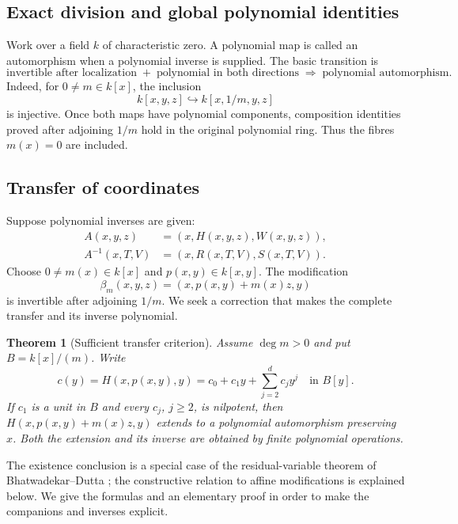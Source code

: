 \documentclass[11pt,a4paper]{article}
\newtheorem{theorem}{Theorem}[section]
\begin{document}
\subsection{Exact division and global polynomial identities}

Work over a field $k$ of characteristic zero. A polynomial map is called an
automorphism when a polynomial inverse is supplied. The basic transition is
\[
\boxed{\text{invertible after localization}
\; +\; \text{polynomial in both directions}
\;\Longrightarrow\; \text{polynomial automorphism}.}
\]
Indeed, for $0\ne m\in k[x]$, the inclusion
\[
k[x,y,z]\hookrightarrow k[x,1/m,y,z]
\]
is injective. Once both maps have polynomial components, composition
identities proved after adjoining $1/m$ hold in the original polynomial
ring. Thus the fibres $m(x)=0$ are included.

\subsection{Transfer of coordinates}

Suppose polynomial inverses are given:
\begin{equation}\label{eq:given}
\begin{aligned}
A(x,y,z)&=(x,H(x,y,z),W(x,y,z)),\\
A^{-1}(x,T,V)&=(x,R(x,T,V),S(x,T,V)).
\end{aligned}
\end{equation}
Choose $0\ne m(x)\in k[x]$ and $p(x,y)\in k[x,y]$. The modification
\[
\beta_m(x,y,z)=(x,p(x,y)+m(x)z,y)
\]
is invertible after adjoining $1/m$. We seek a correction that makes the
complete transfer and its inverse polynomial.

\begin{theorem}[Sufficient transfer criterion]\label{thm:transfer}
Assume $\deg m>0$ and put $B=k[x]/(m)$. Write
\[
c(y)=H(x,p(x,y),y)=c_0+c_1y+\sum_{j=2}^{d}c_jy^j
\quad\text{in }B[y].
\]
If $c_1$ is a unit in $B$ and every $c_j$, $j\ge2$, is nilpotent, then
$H(x,p(x,y)+m(x)z,y)$ extends to a polynomial automorphism preserving $x$.
Both the extension and its inverse are obtained by finite polynomial
operations.
\end{theorem}

The existence conclusion is a special case of the residual-variable
theorem of Bhatwadekar--Dutta \cite{BD}; the constructive relation to
affine modifications is explained below. We give the formulas and an
elementary proof in order to make the companions and inverses explicit.
\end{document}
